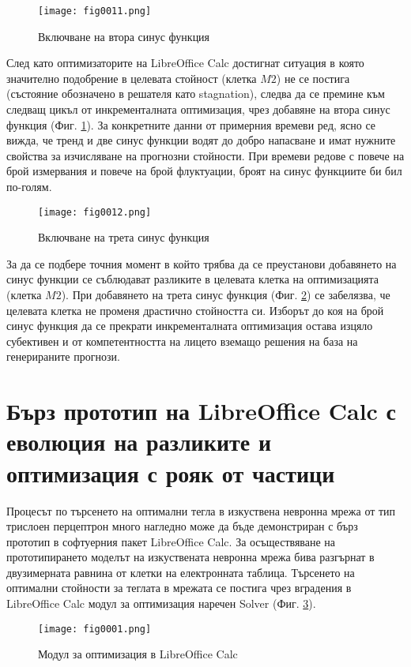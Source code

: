 \begin{figure}[H]
  \centering
  \texttt{[image: fig0011.png]}
  \caption{Включване на втора синус функция}
\label{fig0011}
\end{figure}

След като оптимизаторите на LibreOffice Calc достигнат ситуация в която значително подобрение в целевата стойност (клетка $M2$) не се постига (състояние обозначено в решателя като stagnation), следва да се премине към следващ цикъл от инкременталната оптимизация, чрез добавяне на втора синус функция (Фиг. \ref{fig0011}). За конкретните данни от примерния времеви ред, ясно се вижда, че тренд и две синус функции водят до добро напасване и имат нужните свойства за изчисляване на прогнозни стойности. При времеви редове с повече на брой измервания и повече на брой флуктуации, броят на синус функциите би бил по-голям. 

\begin{figure}[H]
  \centering
  \texttt{[image: fig0012.png]}
  \caption{Включване на трета синус функция}
\label{fig0012}
\end{figure}

За да се подбере точния момент в който трябва да се преустанови добавянето на синус функции се съблюдават разликите в целевата клетка на оптимизацията (клетка $M2$). При добавянето на трета синус функция (Фиг. \ref{fig0012}) се забелязва, че целевата клетка не променя драстично стойността си. Изборът до коя на брой синус функция да се прекрати инкременталната оптимизация остава изцяло субективен и от компетентността на лицето вземащо решения на база на генерираните прогнози. 

\section{Бърз прототип на LibreOffice Calc с еволюция на разликите и оптимизация с рояк от частици}

Процесът по търсенето на оптимални тегла в изкуствена невронна мрежа от тип трислоен перцептрон много нагледно може да бъде демонстриран с бърз прототип в софтуерния пакет LibreOffice Calc. За осъществяване на прототипирането моделът на изкуствената невронна мрежа бива разгърнат в двузимерната равнина от клетки на електронната таблица. Търсенето на оптимални стойности за теглата в мрежата се постига чрез вградения в LibreOffice Calc модул за оптимизация наречен Solver (Фиг. \ref{fig001}).

\begin{figure}[H]
  \centering
  \texttt{[image: fig0001.png]}
  \caption{Модул за оптимизация в LibreOffice Calc}
\label{fig001}
\end{figure}

